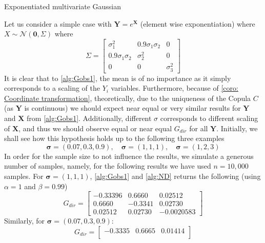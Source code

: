 \documentclass[../Thesis.tex]{subfiles}
\begin{document}
\begin{example} \label{ex:1}
    Exponentiated multivariate Gaussian

    Let us consider a simple case with $\mathbf{Y} = e^{\mathbf{X}}$ (element wise exponentiation) where $X \sim \mathcal{N}\left(\mathbf{0}, \Sigma\right)$ where
    $$\Sigma = \begin{bmatrix}
            \sigma_1^2           & 0.9\sigma_1\sigma_2 & 0          \\
            0.9 \sigma_1\sigma_2 & \sigma_2^2          & 0          \\
            0                    & 0                   & \sigma_3^2
        \end{bmatrix}$$
    It is clear that to \autoref{alg:Gobs1}, the mean is of no importance as it simply corresponds to a scaling of the $Y_i$ variables. Furthermore, because of \autoref{coro: Coordinate transformation}, theoretically, due to the uniqueness of the Copula $C$ (as $\boldsymbol Y$ is continuous) we should expect near equal or very similar results for $\boldsymbol Y$ and $\boldsymbol X$ from \autoref{alg:Gobs1}. Additionally, different $\sigma$ corresponds to different scaling of $\boldsymbol X$, and thus we should observe equal or near equal $G_{dir}$ for all $\boldsymbol Y$. Initially, we shall see how this hypothesis holds up to the following three examples
    $$
        \boldsymbol\sigma = (0.07, 0.3, 0.9), \quad
        \boldsymbol\sigma = (1,1,1), \quad
        \boldsymbol\sigma = (1,2,3)
    $$
    In order for the sample size to not influence the results, we simulate a generous number of samples, namely, for the following results we have used $n = 10{,}000$ samples. For $\boldsymbol\sigma = (1,1,1)$, \autoref{alg:Gobs1} and \autoref{alg:ND} returns the following (using $\alpha = 1$ and $\beta = 0.99$)
    \begin{equation} \label{eq:s medium G_dir}
        G_{dir} =
        \begin{bmatrix}
            -0.33396 & 0.6660  & 0.02512    \\
            0.6660   & -0.3341 & 0.02730    \\
            0.02512  & 0.02730 & -0.0020583
        \end{bmatrix}
    \end{equation}
    Similarly, for $\boldsymbol\sigma = (0.07, 0.3, 0.9)$:
    \begin{equation} \label{eq:s small G_dir}
        G_{dir} =
        \begin{bmatrix}
            -0.3335 & 0.6665  & 0.01414     \\

\end{bmatrix}
\end{equation}
\end{example}
\end{document}
